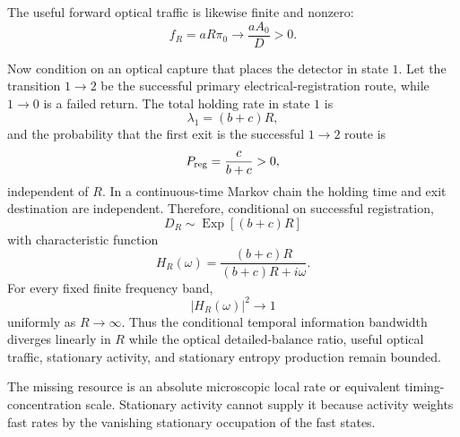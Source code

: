 The useful forward optical traffic is likewise finite and nonzero:
\begin{equation}
f_R=aR\pi_0
\longrightarrow\frac{aA_0}{D}>0.
\end{equation}

Now condition on an optical capture that places the detector in state $1$.  Let the transition $1\to2$ be the successful primary electrical-registration route, while $1\to0$ is a failed return.  The total holding rate in state $1$ is
\begin{equation}
\lambda_1=(b+c)R,
\end{equation}
and the probability that the first exit is the successful $1\to2$ route is
\begin{equation}
P_{\rm reg}=\frac{c}{b+c}>0,
\end{equation}
independent of $R$.  In a continuous-time Markov chain the holding time and exit destination are independent.  Therefore, conditional on successful registration,
\begin{equation}
D_R\sim\operatorname{Exp}[(b+c)R]
\end{equation}
with characteristic function
\begin{equation}
H_R(\omega)
=\frac{(b+c)R}{(b+c)R+i\omega}.
\end{equation}
For every fixed finite frequency band,
\begin{equation}
|H_R(\omega)|^2\to1
\end{equation}
uniformly as $R\to\infty$.  Thus the conditional temporal information bandwidth diverges linearly in $R$ while the optical detailed-balance ratio, useful optical traffic, stationary activity, and stationary entropy production remain bounded.

The missing resource is an absolute microscopic local rate or equivalent timing-concentration scale.  Stationary activity cannot supply it because activity weights fast rates by the vanishing stationary occupation of the fast states.